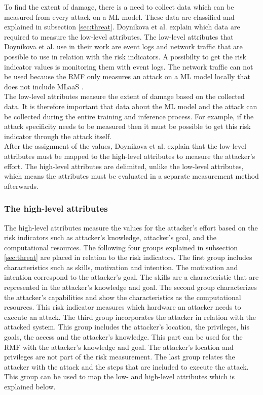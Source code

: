 To find the extent of damage, there is a need to collect data which can be measured from every attack on a ML model. These data are classified and explained in subsection \ref{sec:threat}. Doynikova et al.
\cite{DBLP:conf/crisis/DoynikovaNGK20} explain which data are required to measure the low-level attributes. The low-level attributes that Doynikova et al. use in their work are event logs and network
traffic that are possible to use in relation with the risk indicators. A possibilty to get the risk indicator values is monitoring them with event logs. The network traffic can not be used because the RMF only measures an attack on a ML model locally that does not include MLaaS \cite{DBLP:conf/hci/HaraA21}. \\
The low-level attributes measure the extent of damage based on the collected data. It is therefore important that data about the ML model and the attack can be collected during the entire training and
inference process. For example, if the attack specificity needs to be measured then it must be possible to get this risk indicator through the attack itself. \\
After the assignment of the values, Doynikova et al. explain
that the low-level attributes must be mapped to the high-level attributes to measure the attacker's effort. The high-level attributes are delimited, unlike the low-level
attributes, which means the attributes must be evaluated in a separate measurement method afterwards.

\subsubsection*{The high-level attributes}

The high-level attributes measure the values for the attacker's effort based on the risk indicators such as attacker's knowledge, attacker's goal, and the computational resources. The following four groups explained in
subsection \ref{sec:threat} are placed in relation to the risk indicators. The first group includes characteristics such as skills, motivation and intention. The motivation and intention correspond to
the attacker's goal. The skills are a characteristic that are represented in the attacker's knowledge and goal. The second group characterizes the attacker's capabilities \cite{DBLP:journals/iet-cdt/XueGLYO20}
and show the characteristics as the computational resources. This risk indicator measures which hardware an attacker needs to execute an attack. The third group
incorporates the attacker in relation with the attacked system. This group includes the attacker's location, the privileges, his goals, the access and the attacker's knowledge. This part can be used
for the RMF with the attacker's knowledge and goal. The attacker's location and privileges are not part of the risk measurement. The last group relates the attacker with the attack and the steps that
are included to execute the attack. This group can be used to map the low- and high-level attributes which is explained below.


